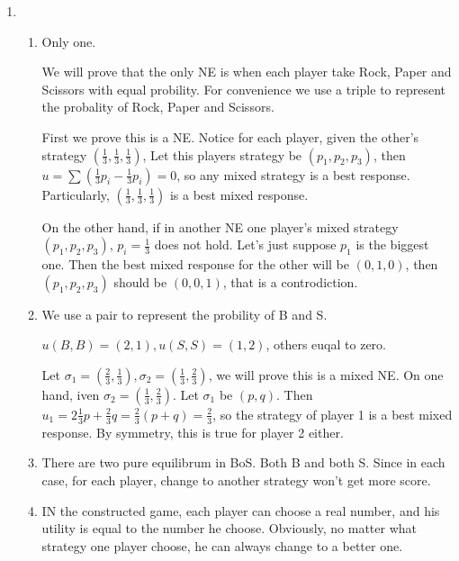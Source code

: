 \documentclass[12pt]{cgtmd}
\begin{document}

\begin{enumerate}
    \item 
        \begin{enumerate}
            \item Only one. 

                We will prove that the only NE is when each player take Rock, Paper and Scissors with equal probility. For convenience we use a triple to represent the probality of Rock, Paper and Scissors.

                First we prove this is a NE. Notice for each player, given the other's strategy $(\frac{1}{3}, \frac{1}{3}, \frac{1}{3})$, Let this players strategy be $(p_1, p_2, p_3)$, then $u = \sum(\frac{1}{3}p_i - \frac{1}{3}p_i) = 0$, so any mixed strategy is a best response. Particularly, $(\frac{1}{3}, \frac{1}{3}, \frac{1}{3})$ is a best mixed response.

                On the other hand, if in another NE one player's mixed strategy $(p_1, p_2, p_3)$, $p_i = \frac{1}{3}$ does not hold. Let's just suppose $p_1$ is the biggest one. Then the best mixed response for the other will be $(0, 1, 0)$, then $(p_1, p_2, p_3)$ should be $(0, 0, 1)$, that is a controdiction.
            \item We use a pair to represent the probility of B and S. 
                
                $u(B, B) = (2, 1), u(S, S) = (1, 2)$, others euqal to zero.

                Let $\sigma_1 = (\frac{2}{3}, \frac{1}{3}), \sigma_2 = (\frac{1}{3}, \frac{2}{3})$, we will prove this is a mixed NE. On one hand, iven $\sigma_2 = (\frac{1}{3}, \frac{2}{3})$. Let $\sigma_1$ be $(p, q)$. Then $u_1 = 2\frac{1}{3}p + \frac{2}{3}q = \frac{2}{3}(p + q) = \frac{2}{3}$, so  the strategy of player 1 is a best mixed response. By symmetry, this is true for player 2 either.
            \item There are two pure equilibrum in BoS. Both B and both S. Since in each case, for each player, change to another strategy won't get more score.
            \item IN the constructed game, each player can choose a real number, and his utility is equal to the number he choose. Obviously, no matter what strategy one player choose, he can always change to a better one.
        \end{enumerate}
\end{enumerate}
\end{document}
